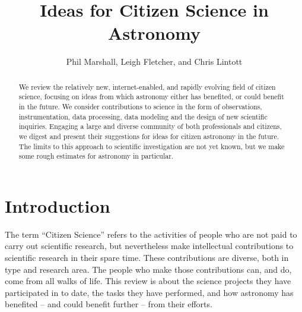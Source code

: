 \documentclass{ar2e}
\begin{document}

\jvol{}
\ARinfo{}

\title{Ideas for Citizen Science in Astronomy}

\author{Phil Marshall,
Leigh Fletcher, and
Chris Lintott
}




\begin{abstract} 

We review the relatively new, internet-enabled, and rapidly evolving field of
citizen science, focusing on ideas from which astronomy either has benefited, or
could benefit in the future. We consider contributions to science in the form of
observations, instrumentation, data processing, data modeling and the design of
new scientific inquiries. Engaging a large and diverse community of both
professionals and citizens, we digest and present their suggestions for ideas
for citizen astronomy in the future. The limits to this approach to scientific
investigation are not yet known, but we make some rough estimates for astronomy
in particular.

\end{abstract}

\maketitle


\section{Introduction}
\label{sec:intro}

The term ``Citizen Science'' refers to the activities of people who are not paid
to carry out scientific research, but nevertheless make intellectual
contributions to scientific research in their spare time. These contributions
are diverse, both in type and research area. The people who make those
contributions can, and do, come from all walks of life. This review is about the
science projects they have participated in to date, the tasks they have
performed, and how astronomy has benefited -- and could benefit further -- from
their efforts.
\end{document}
